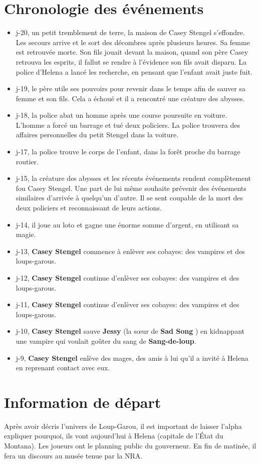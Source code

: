 \documentclass[oneside,12pt]{book}
\newcommand{\Mathew}{\textbf{Sad Song} }
\begin{document}
\begin{flushleft}
\section{Chronologie des événements}
\begin{itemize}
\item j-20, un petit tremblement de terre, la maison de Casey Stengel s’effondre. Les secours arrive et le sort des décombres après plusieurs heures. Sa femme est retrouvée morte. Son fils jouait devant la maison, quand son père Casey retrouva les esprits, il fallut se rendre à l’évidence son fils avait disparu. La police d’Helena a lancé les recherche, en pensant que l’enfant avait juste fuit. 
\item j-19, le père utile ses pouvoirs pour revenir dans le temps afin de sauver sa femme et son fils. Cela a échoué et il a rencontré une créature des abysses. 
\item j-18, la police abat un homme après une course poursuite en voiture. L’homme a forcé un barrage et tué deux policiers. La police trouvera des affaires personnelles du petit Stengel dans la voiture. 
\item j-17, la police trouve le corps de l’enfant, dans la forêt proche du barrage routier.
\item j-15, la créature des abysses et les récents événements rendent complètement fou Casey Stengel. Une part de lui même souhaite prévenir des événements similaires d’arrivée à quelqu’un d’autre. Il se sent coupable de la mort des deux policiers et reconnaissant de leurs actions.
\item j-14, il joue au loto et gagne une énorme somme d’argent, en utilisant sa magie.
\item j-13, \textbf{Casey Stengel} commence à enlèver ses cobayes: des vampires et des loups-garous. 
\item j-12, \textbf{Casey Stengel} continue d’enlèver ses cobayes: des vampires et des loups-garous.
\item j-11, \textbf{Casey Stengel} continue d’enlèver ses cobayes: des vampires et des loups-garous.
\item j-10, \textbf{Casey Stengel} sauve \textbf{Jessy} (la sœur de \Mathew) en kidnappant une vampire qui voulait goûter du sang de \textbf{Sang-de-loup}.
\item j-9, \textbf{Casey Stengel} enlève des mages, des amis à lui qu’il a invité à Helena en reprenant contact avec eux.

\end{itemize}
\section{Information de départ}
Après avoir décris l’univers de Loup-Garou, il est important de laisser l’alpha expliquer pourquoi, ils vont aujourd’hui à Helena (capitale de l’État du Montana). Les joueurs ont le planning public du gouverneur. En fin de matinée, il fera un discours au musée tenue par la NRA. 


\end{flushleft}
\end{document}
